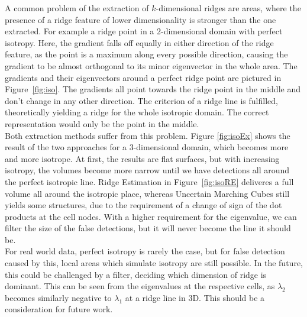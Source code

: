 A common problem of the extraction of $k$-dimensional ridges are areas,
where the presence of a ridge feature of lower dimensionality is
stronger than the one extracted. For example a ridge point in a
2-dimensional domain with perfect isotropy. Here, the gradient falls off
equally in either direction of the ridge feature, as the point is a
maximum along every possible direction, causing the gradient to be
almost orthogonal to its minor eigenvector in the whole area. The
gradients and their eigenvectors around a perfect ridge point are
pictured in Figure~\ref{fig:iso}. The gradients all point towards the
ridge point in the middle and don't change in any other direction. The
criterion of a ridge line is fulfilled, theoretically yielding a ridge
for the whole isotropic domain. The correct representation would only be
the point in the middle.\\
\indent Both extraction methods suffer from this problem. Figure
\ref{fig:isoEx} shows the result of the two approaches for a 3-dimensional
domain, which becomes more and more isotrope. At first, the results are
flat surfaces, but with increasing isotropy, the volumes become more
narrow until we have detections all around the perfect isotropic line.
Ridge Estimation in Figure~\ref{fig:isoRE} deliveres a full volume
all around the isotropic place, whereas Uncertain Marching Cubes still
yields some structures, due to the requirement of a change of sign
of the dot products at the cell nodes. With a higher requirement
for the eigenvalue, we can filter the size of the false detections,
but it will never become the line it should be.\\
\indent For real world data, perfect isotropy is rarely the case, but
for false detection caused by this, local areas which simulate isotropy
are still possible. In the future, this could be challenged by a filter,
deciding which dimension of ridge is dominant. This can be seen from the
eigenvalues at the respective cells, as $\lambda_2$ becomes similarly
negative to $\lambda_1$ at a ridge line in 3D. This should be a
consideration for future work.

